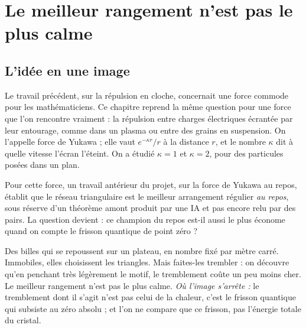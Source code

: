 \chapter[Le meilleur n'est pas le plus calme]{Le meilleur rangement n'est pas le plus calme}


\section*{L'idée en une image}

Le travail précédent, sur la répulsion en cloche, concernait une force commode pour les
mathématiciens. Ce chapitre reprend la même question pour une force que l'on rencontre vraiment : la
répulsion entre charges électriques \og écrantée\fg{} par leur entourage, comme dans un plasma
ou entre des grains en suspension. On l'appelle force de Yukawa ; elle vaut $e^{-\kappa r}/r$ à
la distance $r$, et le nombre $\kappa$ dit à quelle vitesse l'écran l'éteint. On a étudié
$\kappa=1$ et $\kappa=2$, pour des particules posées dans un plan.

Pour cette force, un travail antérieur du projet, sur la force de Yukawa au repos, établit que le réseau triangulaire
est le meilleur arrangement régulier \emph{au repos}, sous réserve d'un théorème amont produit
par une IA et pas encore relu par des pairs. La question devient : ce champion du repos est-il
aussi le plus économe quand on compte le frisson quantique de point zéro ?

\begin{analogie}
Des billes qui se repoussent sur un plateau, en nombre fixé par mètre carré. Immobiles, elles
choisissent les triangles. Mais faites-les trembler : on découvre qu'en penchant très légèrement
le motif, le tremblement coûte un peu moins cher. Le meilleur rangement n'est pas le plus calme.
\emph{Où l'image s'arrête :} le tremblement dont il s'agit n'est pas celui de la chaleur, c'est
le frisson quantique qui subsiste au zéro absolu ; et l'on ne compare que ce frisson, pas
l'énergie totale du cristal.
\end{analogie}

